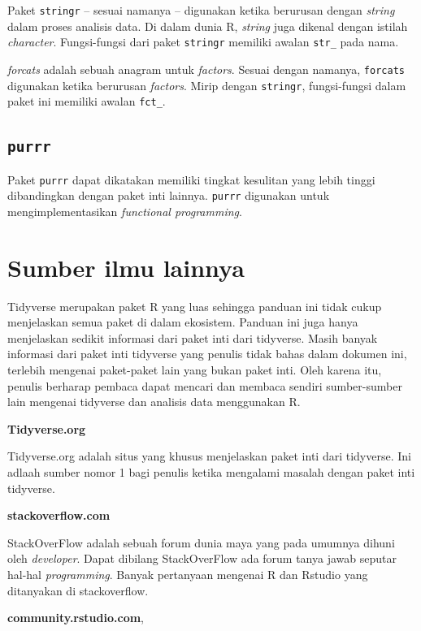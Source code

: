 \documentclass[]{book}
\begin{document}
Paket \texttt{stringr} -- sesuai namanya -- digunakan ketika berurusan
dengan \emph{string} dalam proses analisis data. Di dalam dunia R,
\emph{string} juga dikenal dengan istilah \emph{character}.
Fungsi-fungsi dari paket \texttt{stringr} memiliki awalan \texttt{str\_}
pada nama.

\emph{forcats} adalah sebuah anagram untuk \emph{factors}. Sesuai dengan
namanya, \texttt{forcats} digunakan ketika berurusan \emph{factors}.
Mirip dengan \texttt{stringr}, fungsi-fungsi dalam paket ini memiliki
awalan \texttt{fct\_}.

\subsection{\texorpdfstring{\texttt{purrr}}{purrr}}\label{purrr}

Paket \texttt{purrr} dapat dikatakan memiliki tingkat kesulitan yang
lebih tinggi dibandingkan dengan paket inti lainnya. \texttt{purrr}
digunakan untuk mengimplementasikan \emph{functional programming}.

\section{Sumber ilmu lainnya}\label{sumber-ilmu-lainnya}

Tidyverse merupakan paket R yang luas sehingga panduan ini tidak cukup
menjelaskan semua paket di dalam ekosistem. Panduan ini juga hanya
menjelaskan sedikit informasi dari paket inti dari tidyverse. Masih
banyak informasi dari paket inti tidyverse yang penulis tidak bahas
dalam dokumen ini, terlebih mengenai paket-paket lain yang bukan paket
inti. Oleh karena itu, penulis berharap pembaca dapat mencari dan
membaca sendiri sumber-sumber lain mengenai tidyverse dan analisis data
menggunakan R.

\textbf{Tidyverse.org}

Tidyverse.org adalah situs yang khusus menjelaskan paket inti dari
tidyverse. Ini adlaah sumber nomor 1 bagi penulis ketika mengalami
masalah dengan paket inti tidyverse.

\textbf{stackoverflow.com}

StackOverFlow adalah sebuah forum dunia maya yang pada umumnya dihuni
oleh \emph{developer}. Dapat dibilang StackOverFlow ada forum tanya
jawab seputar hal-hal \emph{programming}. Banyak pertanyaan mengenai R
dan Rstudio yang ditanyakan di stackoverflow.

\textbf{community.rstudio.com},
\end{document}
